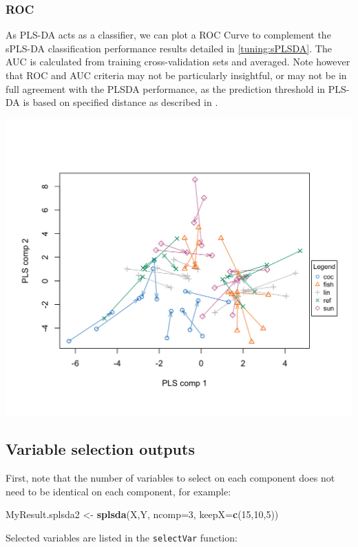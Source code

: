 \documentclass[]{book}
\newenvironment{Shaded}{\begin{snugshade}}{\end{snugshade}}
\newcommand{\KeywordTok}[1]{\textcolor[rgb]{0.13,0.29,0.53}{\textbf{#1}}}
\newcommand{\DataTypeTok}[1]{\textcolor[rgb]{0.13,0.29,0.53}{#1}}
\newcommand{\DecValTok}[1]{\textcolor[rgb]{0.00,0.00,0.81}{#1}}
\newcommand{\StringTok}[1]{\textcolor[rgb]{0.31,0.60,0.02}{#1}}
\newcommand{\OperatorTok}[1]{\textcolor[rgb]{0.81,0.36,0.00}{\textbf{#1}}}
\newcommand{\NormalTok}[1]{#1}
\theoremstyle{definition}
\theoremstyle{definition}
\theoremstyle{definition}
\theoremstyle{remark}
\begin{document}
\subsubsection{ROC}\label{roc}

As PLS-DA acts as a classifier, we can plot a ROC Curve to complement
the sPLS-DA classification performance results detailed in
\ref{tuning:sPLSDA}. The AUC is calculated from training
cross-validation sets and averaged. Note however that ROC and AUC
criteria may not be particularly insightful, or may not be in full
agreement with the PLSDA performance, as the prediction threshold in
PLS-DA is based on specified distance as described in \citep{mixomics}.

\begin{center}\includegraphics[width=0.5\linewidth]{Figures/unnamed-chunk-8-1} \end{center}

\subsection{Variable selection
outputs}\label{variable-selection-outputs}

First, note that the number of variables to select on each component
does not need to be identical on each component, for example:

\begin{Shaded}
\begin{Highlighting}[]
\NormalTok{MyResult.splsda2 <-}\StringTok{ }\KeywordTok{splsda}\NormalTok{(X,Y, }\DataTypeTok{ncomp=}\DecValTok{3}\NormalTok{, }\DataTypeTok{keepX=}\KeywordTok{c}\NormalTok{(}\DecValTok{15}\NormalTok{,}\DecValTok{10}\NormalTok{,}\DecValTok{5}\NormalTok{))}
\end{Highlighting}
\end{Shaded}

Selected variables are listed in the \texttt{selectVar} function:

\begin{Shaded}
\end{Shaded}
\end{document}
